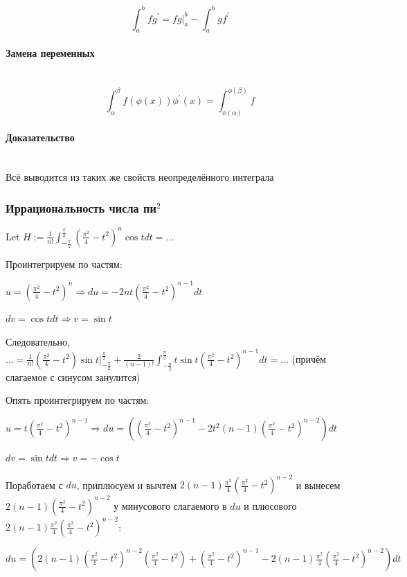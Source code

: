 \documentclass{article}
\let\vanillaparagraph\paragraph
\renewcommand{\paragraph}[1]{\vanillaparagraph{#1}\mbox{}\\}
\begin{document}
\[\int_a^b{fg^\prime} = fg|_a^b - \int_a^b{gf^\prime}\]


\paragraph{Замена переменных}

\[\int_\alpha^\beta{f(\phi(x))\phi^\prime(x)} = \int_{\phi(\alpha)}^{\phi(\beta)}{f}\]

\paragraph{Доказательство}

Всё выводится из таких же свойств неопределённого интеграла

\subsubsection{Иррациональность числа пи\texorpdfstring{$^2$}{}}

Let $H := \frac{1}{n!}\int_{-\frac{\pi}{2}}^{\frac{\pi}{2}}{\left(\frac{\pi^2}{4} - t^2\right)^n\cos t dt} = \ldots$

Проинтегрируем по частям:

$u = \left(\frac{\pi^2}{4} - t^2\right)^n \Rightarrow du = -2nt\left(\frac{\pi^2}{4} - t^2\right)^{n - 1}dt$

$dv = \cos t dt \Rightarrow v = \sin t$

Следовательно, $\ldots = \frac{1}{n!}\left(\frac{\pi^2}{4} - t^2\right)\sin t|_{-\frac{\pi}{2}}^{\frac{\pi}{2}} + \frac{2}{(n - 1)!}\int_{-\frac{\pi}{2}}^{\frac{\pi}{2}}{t\sin t \left(\frac{\pi^2}{4} - t^2\right)^{n - 1}dt} = \ldots$ (причём слагаемое с синусом занулится)

Опять проинтегрируем по частям:

$u = t\left(\frac{\pi^2}{4} - t^2\right)^{n - 1} \Rightarrow du = \left(\left(\frac{\pi^2}{4} - t^2\right)^{n - 1} - 2t^2(n - 1)\left(\frac{\pi^2}{4} - t^2\right)^{n - 2}\right)dt$

$dv = \sin t dt \Rightarrow v = -\cos t$

Поработаем с $du$, приплюсуем и вычтем $2(n - 1)\frac{\pi^2}{4}\left(\frac{\pi^2}{4} - t^2\right)^{n - 2}$ и вынесем $2(n - 1)\left(\frac{\pi^2}{4} - t^2\right)^{n - 2}$ у минусового слагаемого в $du$ и плюсового $2(n - 1)\frac{\pi^2}{4}\left(\frac{\pi^2}{4} - t^2\right)^{n - 2}$:

$du = \left( 2(n - 1)\left( \frac{\pi^2}{4} - t^2\right)^{n - 2}\left(\frac{\pi^2}{4} - t^2\right) + \left(\frac{\pi^2}{4} - t^2\right)^{n - 1} - 2(n - 1)\frac{\pi^2}{4}\left(\frac{\pi^2}{4} - t^2\right)^{n - 2}\right)dt$
\end{document}
